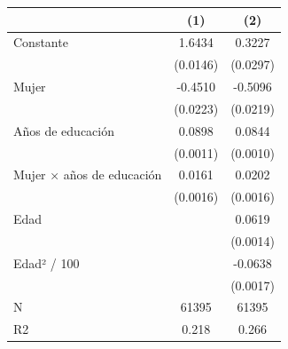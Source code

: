 \begin{table}
\centering
\begin{tabular}[t]{lcc}
\toprule
  & (1) & (2)\\
\midrule
Constante & 1.6434 & 0.3227\\
 & (0.0146) & (0.0297)\\
Mujer & -0.4510 & -0.5096\\
 & (0.0223) & (0.0219)\\
Años de educación & 0.0898 & 0.0844\\
 & (0.0011) & (0.0010)\\
Mujer × años de educación & 0.0161 & 0.0202\\
 & (0.0016) & (0.0016)\\
Edad &  & 0.0619\\
 &  & (0.0014)\\
Edad² / 100 &  & -0.0638\\
 &  & (0.0017)\\
\midrule
N & 61395 & 61395\\
R2 & 0.218 & 0.266\\
\bottomrule
\end{tabular}
\end{table}
